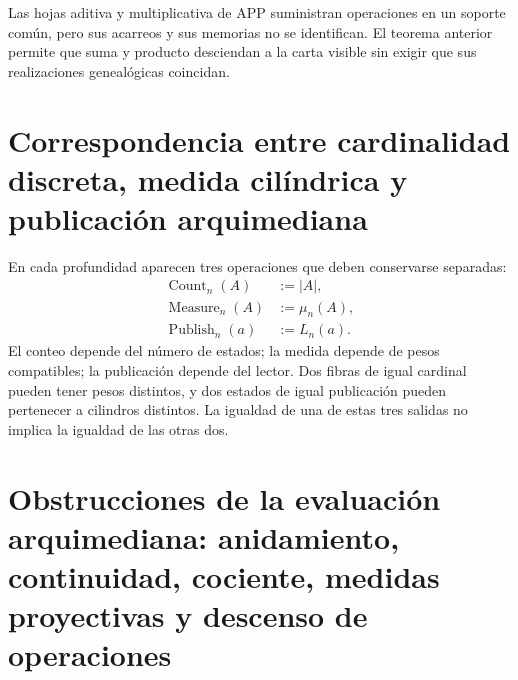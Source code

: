 Las hojas aditiva y multiplicativa de APP suministran operaciones en un
soporte común, pero sus acarreos y sus memorias no se identifican. El
teorema anterior permite que suma y producto desciendan a la carta visible
sin exigir que sus realizaciones genealógicas coincidan.

\section{Correspondencia entre cardinalidad discreta, medida cilíndrica y publicación arquimediana}

En cada profundidad aparecen tres operaciones que deben conservarse
separadas:
\begin{align}
 \operatorname{Count}_n(A)&:=|A|,
 \label{p12-83-c18-s1:eq:operacion-conteo-u024}\\
 \operatorname{Measure}_n(A)&:=\mu_n(A),
 \label{p12-83-c18-s1:eq:operacion-medida-u024}\\
 \operatorname{Publish}_n(a)&:=L_n(a).
 \label{p12-83-c18-s1:eq:operacion-publicacion-u024}
\end{align}
El conteo depende del número de estados; la medida depende de pesos
compatibles; la publicación depende del lector. Dos fibras de igual
cardinal pueden tener pesos distintos, y dos estados de igual publicación
pueden pertenecer a cilindros distintos. La igualdad de una de estas tres
salidas no implica la igualdad de las otras dos.

\section{Obstrucciones de la evaluación arquimediana: anidamiento, continuidad, cociente, medidas proyectivas y descenso de operaciones}

